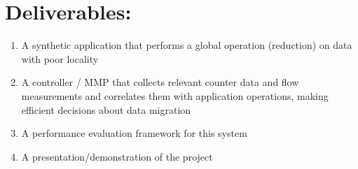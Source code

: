 \documentclass[12pt]{article} \usepackage{graphicx} \usepackage{amsmath}
\begin{document}
\section*{Deliverables:} \label{deriverables} 
\begin{enumerate} 
  \item A synthetic application that performs a global operation (reduction) on
  data with poor locality 
  \item A controller / MMP that collects relevant counter data and flow
  measurements and correlates them with application operations, making efficient
  decisions about data migration
  \item A performance evaluation framework for this system 
  \item A presentation/demonstration of the project 
\end{enumerate}



% 
\end{document}
